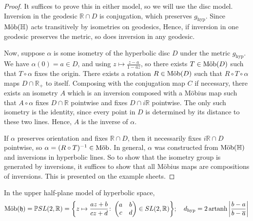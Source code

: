 \begin{proof}
	It suffices to prove this in either model, so we will use the disc model.
	Inversion in the geodesic \( \mathbb R \cap D \) is conjugation, which preserves \( g_{\text{hyp}} \).
	Since \( \text{M\"ob}(\mathbb H) \) acts transitively by isometries on geodesics, %
	Hence, if inversion in one geodesic preserves the metric, so does inversion in any geodesic.

	Now, suppose \( \alpha \) is some isometry of the hyperbolic disc \( D \) under the metric \( g_{\text{hyp}} \).
	We have \( \alpha(0) = a \in D \), and using \( z \mapsto \frac{z - a}{1 - \overline a z} \), so there exists \( T \in \text{M\"ob}(D) \) such that \( T \circ \alpha \) fixes the origin.
	There exists a rotation \( R \in \text{M\"ob}(D) \) such that \( R \circ T \circ \alpha \) maps \( D \cap \mathbb R_+ \) to itself.
	Composing with the conjugation map \( C \) if necessary, there exists an isometry \( A \) which is an inversion composed with a M\"obius map such that \( A \circ \alpha \) fixes \( D \cap \mathbb R \) pointwise and fixes \( D \cap i\mathbb R \) pointwise.
	The only such isometry is the identity, since every point in \( D \) is determined by its distance to these two lines.
	Hence, \( A \) is the inverse of \( \alpha \).

	If \( \alpha \) preserves orientation and fixes \( \mathbb R \cap D \), then it necessarily fixes \( i\mathbb R \cap D \) pointwise, so \( \alpha = (R \circ T)^{-1} \in \text{M\"ob} \).
	In general, \( \alpha \) was constructed from \( \text{M\"ob}(\mathbb H) \) and inversions in hyperbolic lines.
	So to show that the isometry group is generated by inversions, it suffices to show that all M\"obius maps are compositions of inversions.
	This is presented on the example sheets.
\end{proof}
In the upper half-plane model of hyperbolic space,
\[
	\text{M\"ob}(\mathfrak{h}) = \mathbb PSL(2,\mathbb R) = \qty{z \mapsto \frac{az+b}{cz+d} \colon \begin{pmatrix}
			a & b \\
			c & d
		\end{pmatrix} \in SL(2,\mathbb R)};\quad d_{\text{hyp}} = 2 \operatorname{artanh} \abs{\frac{b - a}{b - \overline a}}
\]

